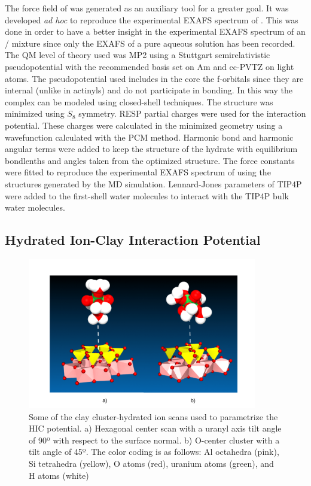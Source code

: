 The force field of  was generated as an auxiliary tool for a greater goal. It 
was 
developed \textit{ad hoc} to reproduce the experimental EXAFS spectrum of . This 
was done in order to have a better insight in the experimental EXAFS 
spectrum of an  / mixture since only the EXAFS of a pure
 aqueous solution has been recorded. The QM level of theory used was MP2 using a 
Stuttgart
semirelativistic 
pseudopotential\cite{Dolg_RECP} with the recommended basis set on Am and 
cc-PVTZ\cite{DunningBasisSet1_Dunning_JChemPhys_1989,DunningBasisSet4_Dunning_JChemPhys_1992,
DunningBasisSet3_Dunning_JChemPhys_1993,DunningBasisSet2_Dunning_JChemPhys_1994} on light atoms. The 
pseudopotential used includes in the core the f-orbitals since they are internal (unlike in 
actinyls) and do not participate in bonding. In this way the complex can be modeled using 
closed-shell techniques. The structure was minimized using $S_{8}$ symmetry. 
RESP\cite{RESP_JPhysChem_Kollman_1993} partial charges were used for the interaction potential. 
These charges were calculated in the minimized geometry using a wavefunction calculated with the 
PCM method\cite{PCM1_ChemPhys_Tomasi_1981,PCM2_JChemPhys_Tomasi_1997}. Harmonic bond and harmonic 
angular terms were added to keep the structure of the hydrate with equilibrium bondlenths and 
angles taken from the optimized structure. The force constants were fitted to reproduce the 
experimental EXAFS spectrum of  using the structures generated by the MD simulation. 
Lennard-Jones 
parameters of TIP4P were added to the first-shell water molecules to interact with the TIP4P bulk 
water molecules.

\subsection[Hydrated Ion-Clay Interaction Potential]{Hydrated Ion-Clay Interaction Potential}
\begin{figure}
\centering 
\includegraphics[width=10cm]{./images/scan.pdf}
\caption[QM scans used to parametrize the HIC]{Some of the clay cluster-hydrated ion scans 
used to parametrize the HIC 
potential. a) Hexagonal center scan with a uranyl axis tilt angle of 90º with respect to the 
surface normal. b) O-center cluster with a tilt angle of 45º. The color coding is as follows: Al 
octahedra (pink), Si tetrahedra (yellow), O atoms (red), uranium atoms (green), and H atoms (white)  
}
\label{scan}
\end{figure}

